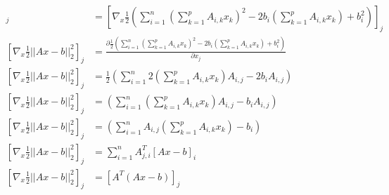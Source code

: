 \documentclass[a4paper,10pt]{article}
\begin{document}
\subsection{}  
\label{P2}  
\begin{align*}  
[\nabla_{x} \frac{1}{2}||Ax - b||^{2}_{2}]_{j} &= [\nabla_{x} \frac{1}{2}(\sum^{n}_{i = 1} (\sum^{p}_{k = 1} A_{i, k}x_{k})^{2} - 2b_{i}(\sum^{p}_{k = 1} A_{i, k}x_{k}) + b_{i}^{2})]_{j}\\  
[\nabla_{x} \frac{1}{2}||Ax - b||^{2}_{2}]_{j} &= \frac{\partial\frac{1}{2}(\sum^{n}_{i = 1} (\sum^{p}_{k = 1} A_{i, k}x_{k})^{2} - 2b_{i}(\sum^{p}_{k = 1} A_{i, k}x_{k}) + b_{i}^{2})}{\partial x_{j}}\\  
[\nabla_{x} \frac{1}{2}||Ax - b||^{2}_{2}]_{j} &= \frac{1}{2}(\sum^{n}_{i = 1} 2(\sum^{p}_{k = 1} A_{i, k}x_{k})A_{i, j} - 2b_{i} A_{i, j})\\  
[\nabla_{x} \frac{1}{2}||Ax - b||^{2}_{2}]_{j} &= (\sum^{n}_{i = 1} (\sum^{p}_{k = 1} A_{i, k}x_{k})A_{i, j} - b_{i} A_{i, j})\\  
[\nabla_{x} \frac{1}{2}||Ax - b||^{2}_{2}]_{j} &= (\sum^{n}_{i = 1} A_{i, j}(\sum^{p}_{k = 1} A_{i, k}x_{k}) - b_{i} )\\  
[\nabla_{x} \frac{1}{2}||Ax - b||^{2}_{2}]_{j} &= \sum^{n}_{i = 1} A^{T}_{j, i}[Ax - b]_{i}\\  
[\nabla_{x} \frac{1}{2}||Ax - b||^{2}_{2}]_{j} &= [A^{T}(Ax - b)]_{j}  
\end{align*}
\end{document}
